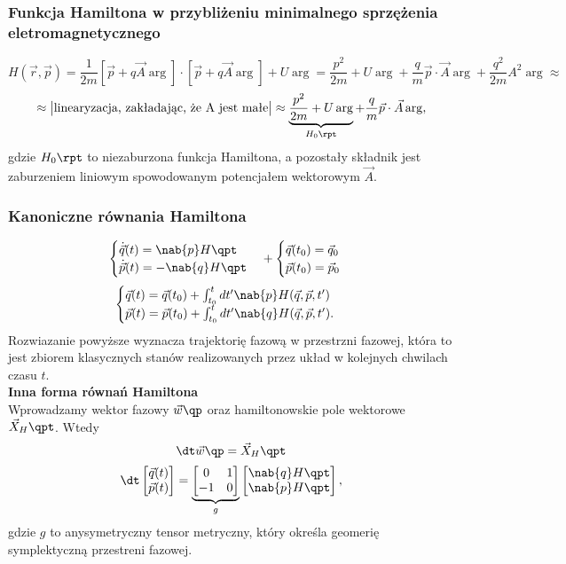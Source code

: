 \subsubsection{Funkcja Hamiltona w przybliżeniu minimalnego sprzężenia 
eletromagnetycznego}
$$H(\vec{r},\vec{p}) = \frac{1}{2m} [\vec{p}+q\vec{A}\arg ]\cdot[\vec{p}+
q\vec{A}\arg ] + U\arg= \frac{p^2}{2m} + U\arg + \frac{q}{m}\vec{p}\cdot\vec{A}\arg
+\frac{q^2}{2m}A^2\arg \approx$$
$$\approx \big| \mbox{linearyzacja, zakładając, że A jest małe} \big| \approx
\underbrace{\frac{p^2}{2m} + U\arg}_{H_0\rpt} + \frac{q}{m} \vec{p} \cdot \vec{A}
\arg,$$
gdzie $H_0\rpt$ to niezaburzona funkcja Hamiltona, a pozostały składnik jest 
zaburzeniem liniowym spowodowanym potencjałem wektorowym $\vec{A}$.
\subsubsection{Kanoniczne równania Hamiltona}
\begin{equation}
\begin{cases}
	\dot{\vec{q}} (t) = \nab{p} H\qpt \\
	\dot{\vec{p}} (t) = - \nab{q} H\qpt 
\end{cases} +
\begin{cases}
	\vec{q}(t_0) = \vec{q}_0 \\
	\vec{p}(t_0) = \vec{p}_0
\end{cases}
\end{equation}
$$\begin{cases} 
	\vec{q}(t) = \vec{q}(t_0) + \int_{t_0}^t dt' \nab{p} H(\vec{q},\vec{p},t') \\
	\vec{p}(t) = \vec{p}(t_0) + \int_{t_0}^t dt' \nab{q} H(\vec{q},\vec{p},t').
\end{cases}$$
Rozwiazanie powyższe wyznacza trajektorię fazową w przestrzni fazowej, 
która to jest zbiorem klasycznych stanów realizowanych przez układ 
w kolejnych chwilach czasu $t$.\\
\textbf{Inna forma równań Hamiltona}\\
Wprowadzamy wektor fazowy $ \vec{w}\qp $ oraz hamiltonowskie pole wektorowe
$\vec{X}_H \qpt$. Wtedy
\begin{equation} \dt \vec{w}\qp = \vec{X}_H \qpt \end{equation}
\begin{equation} \dt 
\left[ \begin{matrix} \vec{q}(t) \\ \vec{p}(t)  \end{matrix} \right] 
= \underbrace{\left[ \begin{matrix} 0 & 1 \\ -1 & 0  \end{matrix} \right]}_{g}
\left[ \begin{matrix} \nab{q}H\qpt \\ \nab{p}H\qpt \end{matrix} \right]
,\end{equation}
gdzie $g$ to anysymetryczny tensor metryczny, który określa geomerię symplektyczną
przestreni fazowej.
